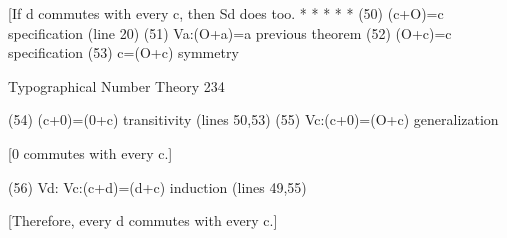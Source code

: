                   [If d commutes with every c, then Sd does too.
                                * * * * *
(50) (c+O)=c                                           specification (line 20)
(51) Va:(O+a)=a                                        previous theorem
(52) (O+c)=c                                           specification
(53) c=(O+c)                                           symmetry




Typographical Number Theory                                                           234

(54) (c+0)=(0+c)                                               transitivity (lines 50,53)
(55) Vc:(c+0)=(O+c)                                            generalization

                                 [0 commutes with every c.]

(56) Vd: Vc:(c+d)=(d+c)                                        induction (lines 49,55)

                       [Therefore, every d commutes with every c.]

